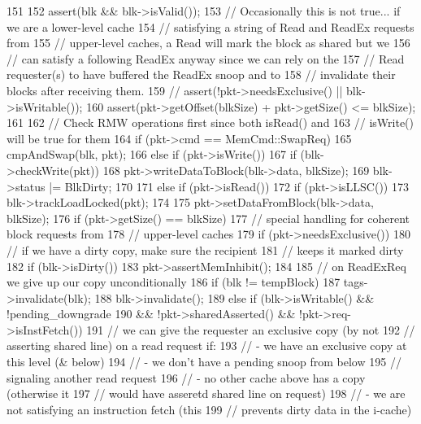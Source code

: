 \begin{DoxyCode}
151 {
152     assert(blk && blk->isValid());
153     // Occasionally this is not true... if we are a lower-level cache
154     // satisfying a string of Read and ReadEx requests from
155     // upper-level caches, a Read will mark the block as shared but we
156     // can satisfy a following ReadEx anyway since we can rely on the
157     // Read requester(s) to have buffered the ReadEx snoop and to
158     // invalidate their blocks after receiving them.
159     // assert(!pkt->needsExclusive() || blk->isWritable());
160     assert(pkt->getOffset(blkSize) + pkt->getSize() <= blkSize);
161 
162     // Check RMW operations first since both isRead() and
163     // isWrite() will be true for them
164     if (pkt->cmd == MemCmd::SwapReq) {
165         cmpAndSwap(blk, pkt);
166     } else if (pkt->isWrite()) {
167         if (blk->checkWrite(pkt)) {
168             pkt->writeDataToBlock(blk->data, blkSize);
169             blk->status |= BlkDirty;
170         }
171     } else if (pkt->isRead()) {
172         if (pkt->isLLSC()) {
173             blk->trackLoadLocked(pkt);
174         }
175         pkt->setDataFromBlock(blk->data, blkSize);
176         if (pkt->getSize() == blkSize) {
177             // special handling for coherent block requests from
178             // upper-level caches
179             if (pkt->needsExclusive()) {
180                 // if we have a dirty copy, make sure the recipient
181                 // keeps it marked dirty
182                 if (blk->isDirty()) {
183                     pkt->assertMemInhibit();
184                 }
185                 // on ReadExReq we give up our copy unconditionally
186                 if (blk != tempBlock)
187                     tags->invalidate(blk);
188                 blk->invalidate();
189             } else if (blk->isWritable() && !pending_downgrade
190                       && !pkt->sharedAsserted() && !pkt->req->isInstFetch()) {
191                 // we can give the requester an exclusive copy (by not
192                 // asserting shared line) on a read request if:
193                 // - we have an exclusive copy at this level (& below)
194                 // - we don't have a pending snoop from below
195                 //   signaling another read request
196                 // - no other cache above has a copy (otherwise it
197                 //   would have asseretd shared line on request)
198                 // - we are not satisfying an instruction fetch (this
199                 //   prevents dirty data in the i-cache)
}}}}
\end{DoxyCode}
